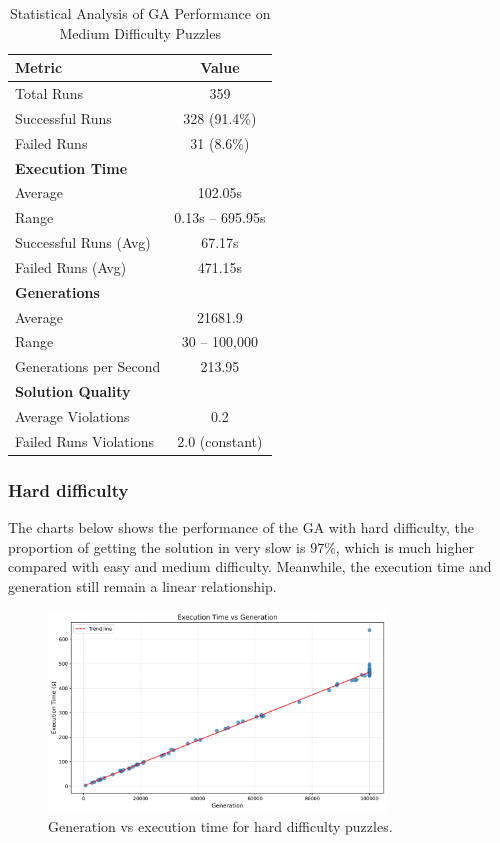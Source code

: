\begin{table}[H]
\centering
\caption{Statistical Analysis of GA Performance on Medium Difficulty Puzzles}
\label{tab:medium_difficulty_stats}
\begin{tabular}{@{}lc@{}}
\toprule
\textbf{Metric} & \textbf{Value} \\
\midrule
Total Runs & 359 \\
Successful Runs & 328 (91.4\%) \\
Failed Runs & 31 (8.6\%) \\
\midrule
\textbf{Execution Time} & \\
Average & 102.05s \\
Range & 0.13s -- 695.95s \\
Successful Runs (Avg) & 67.17s \\
Failed Runs (Avg) & 471.15s \\
\midrule
\textbf{Generations} & \\
Average & 21681.9 \\
Range & 30 -- 100,000 \\
Generations per Second & 213.95 \\
\midrule
\textbf{Solution Quality} & \\
Average Violations & 0.2 \\
Failed Runs Violations & 2.0 (constant) \\
\bottomrule
\end{tabular}
\end{table}

\subsubsection{Hard difficulty}

The charts below shows the performance of the GA with hard difficulty, the proportion of getting the solution in very slow is $97\%$, which is much higher compared with easy and medium difficulty.
Meanwhile, the execution time and generation still remain a linear relationship.

\begin{figure}[H]
\centering
\includegraphics[width=0.8\textwidth]{resources/generation_vs_execution_time_hard.png}
\caption{Generation vs execution time for hard difficulty puzzles.}
\label{fig:generation_vs_execution_time_hard}
\end{figure}

